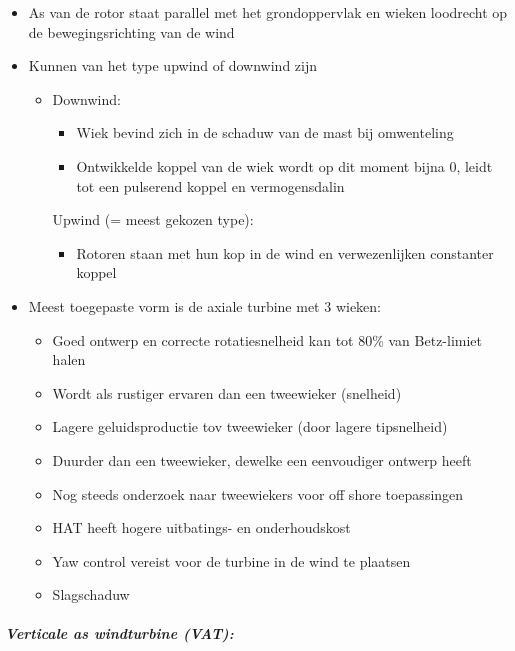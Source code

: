 \documentclass[12pt]{article}
\begin{document}
\begin{itemize}
    \item As van de rotor staat parallel met het grondoppervlak en wieken loodrecht op de bewegingsrichting van de wind 
    \item Kunnen van het type upwind of downwind zijn\begin{itemize}
        \item Downwind:\begin{itemize}
            \item Wiek bevind zich in de schaduw van de mast bij omwenteling
            \item Ontwikkelde koppel van de wiek wordt op dit moment bijna 0, leidt tot een pulserend koppel en vermogensdalin
        \end{itemize}
        Upwind (= meest gekozen type):\begin{itemize}
            \item Rotoren staan met hun kop in de wind en verwezenlijken constanter koppel
        \end{itemize}
    \end{itemize}
    \item Meest toegepaste vorm is de axiale turbine met 3 wieken:\begin{itemize}
        \item Goed ontwerp en correcte rotatiesnelheid kan tot 80\% van Betz-limiet halen
        \item Wordt als rustiger ervaren dan een tweewieker (snelheid)
        \item Lagere geluidsproductie tov tweewieker (door lagere tipsnelheid)
        \item Duurder dan een tweewieker, dewelke een eenvoudiger ontwerp heeft
        \item Nog steeds onderzoek naar tweewiekers voor off shore toepassingen
        \item HAT heeft hogere uitbatings- en onderhoudskost
        \item Yaw control vereist voor de turbine in de wind te plaatsen
        \item Slagschaduw
    \end{itemize}
\end{itemize}
\subparagraph{Verticale as windturbine (VAT):}
\end{document}
